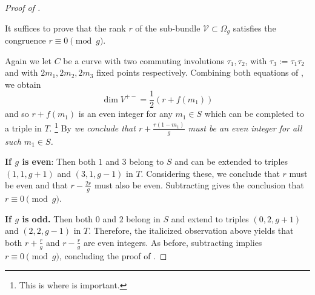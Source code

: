 \documentclass[reqno]{amsart}
\theoremstyle{plain}
\newcommand{\V}{\mathscr{V}}
\newcommand{\Hodge}{\Omega}
\begin{document}
\begin{proof} [Proof of ]
  \label{proof:main} 

  It suffices to prove that the rank $r$ of the sub-bundle $\V \subset
  \Hodge_{g}$ satisfies the congruence $r \equiv 0 \pmod g$. 

  Again we let $C$ be a curve with two commuting involutions
  $\tau_1, \tau_2$, with $\tau_3 := \tau_1 \tau_2$ and with $2m_1, 2m_2, 2m_3$ fixed
  points respectively.  Combining both equations of
  , we obtain 
  \[\dim V^{+-} = \frac{1}{2}(r + f(m_1))\] and so $r+f(m_1)$ is an even
  integer for any $m_1 \in S$ which can be completed to a triple in $T$. \footnote{This is where  is important.}  By
   \textit{we conclude that $r + \frac{r(1-m_1)}{g}$ must
  be an even integer for all such $m_{1} \in S$.} 


  \textbf{If $g$ is even}: Then both $1$ and $3$ belong to $S$ and can be
  extended to triples $(1,1,g+1)$ and $(3,1,g-1)$ in $T$. Considering these, we
  conclude that $r$ must be even and that $r- \frac{2r}{g}$ must also be even.
  Subtracting gives the conclusion that $r \equiv 0 \pmod g$. 

  \textbf{If $g$ is odd.} Then both $0$ and $2$ belong in $S$ and extend to
  triples $(0,2,g+1)$ and $(2,2,g-1)$ in $T$. Therefore, the italicized
  observation above yields that both $r + \frac{r}{g}$ and $r -\frac{r}{g}$ are
  even integers.  As before, subtracting implies $r \equiv 0 \pmod g$, concluding
  the proof of .
\end{proof}




\end{document}
